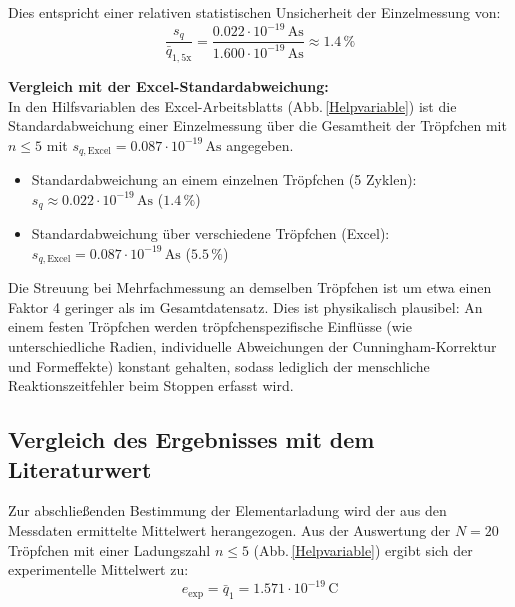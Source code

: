 \documentclass[12pt,a4paper,titlepage]{scrartcl}
\numberwithin{equation}{section}
\numberwithin{table}{section}
\numberwithin{figure}{section}
\begin{document}
\noindent
Dies entspricht einer relativen statistischen Unsicherheit der Einzelmessung von:
\begin{equation}
    \frac{s_q}{\bar{q}_{1,\text{5x}}} = \frac{0.022 \cdot 10^{-19}\,\text{As}}{1.600 \cdot 10^{-19}\,\text{As}} \approx 1.4\,\%
\end{equation}

\medskip
\noindent
\textbf{Vergleich mit der Excel-Standardabweichung:}\\
In den Hilfsvariablen des Excel-Arbeitsblatts (Abb.\,\ref{Helpvariable}) ist die Standardabweichung einer Einzelmessung über die Gesamtheit der Tröpfchen mit $n \le 5$ mit $s_{q,\text{Excel}} = 0.087 \cdot 10^{-19}\,\text{As}$ angegeben. 

\begin{resultbox}
    \begin{itemize}
        \item Standardabweichung an einem einzelnen Tröpfchen (5 Zyklen): $s_q \approx 0.022 \cdot 10^{-19}\,\text{As}$ ($1.4\,\%$)
        \item Standardabweichung über verschiedene Tröpfchen (Excel): $s_{q,\text{Excel}} = 0.087 \cdot 10^{-19}\,\text{As}$ ($5.5\,\%$)\footnotemark
        
    \end{itemize}
    Die Streuung bei Mehrfachmessung an demselben Tröpfchen ist um etwa einen Faktor 4 geringer als im Gesamtdatensatz. Dies ist physikalisch plausibel: An einem festen Tröpfchen werden tröpfchenspezifische Einflüsse (wie unterschiedliche Radien, individuelle Abweichungen der Cunningham-Korrektur und Formeffekte) konstant gehalten, sodass lediglich der menschliche Reaktionszeitfehler beim Stoppen erfasst wird.
\end{resultbox}


\subsection{Vergleich des Ergebnisses mit dem Literaturwert}

Zur abschließenden Bestimmung der Elementarladung wird der aus den Messdaten ermittelte Mittelwert herangezogen. Aus der Auswertung der $N = 20$ Tröpfchen mit einer Ladungszahl $n \le 5$ (Abb.\,\ref{Helpvariable}) ergibt sich der experimentelle Mittelwert zu:
\begin{equation}
    e_{\text{exp}} = \bar{q}_1 = 1.571 \cdot 10^{-19}\,\text{C}
\end{equation}
\end{document}
